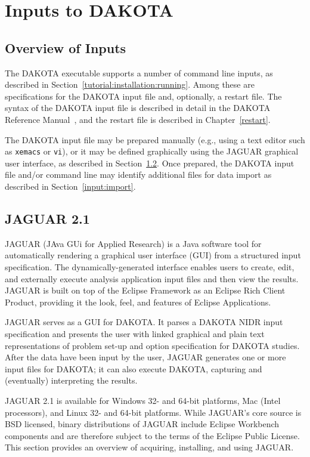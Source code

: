 \chapter{Inputs to DAKOTA}\label{input}

\section{Overview of Inputs}\label{input:overview}

The DAKOTA executable supports a number of command line inputs, as
described in Section~\ref{tutorial:installation:running}.  Among
these are specifications for the DAKOTA input file and, optionally, a
restart file.  The syntax of the DAKOTA input file is described in detail 
in the DAKOTA Reference Manual~\cite{RefMan}, and the restart file is
described in Chapter~\ref{restart}.

The DAKOTA input file may be prepared manually (e.g., using a text
editor such as \texttt{xemacs} or \texttt{vi}), or it may be defined
graphically using the JAGUAR graphical user interface, as described in
Section~\ref{input:gui}.  Once prepared, the DAKOTA input file and/or
command line may identify additional files for data import as
described in Section~\ref{input:import}.

\section{JAGUAR 2.1}\label{input:gui}

JAGUAR (JAva GUi for Applied Research) is a Java software tool for
automatically rendering a graphical user interface (GUI) from a
structured input specification.  The dynamically-generated interface
enables users to create, edit, and externally execute analysis
application input files and then view the results.  JAGUAR is built on
top of the Eclipse Framework \cite{Eclipse} as an Eclipse Rich
Client Product, providing it the look, feel, and features of Eclipse
Applications.

JAGUAR serves as a GUI for DAKOTA.  It parses a DAKOTA NIDR input
specification and presents the user with linked graphical and plain
text representations of problem set-up and option specification for
DAKOTA studies. After the data have been input by the user, JAGUAR
generates one or more input files for DAKOTA; it can also execute
DAKOTA, capturing and (eventually) interpreting the results.

JAGUAR 2.1 is available for Windows 32- and 64-bit platforms, Mac
(Intel processors), and Linux 32- and 64-bit platforms.  While
JAGUAR's core source is BSD licensed, binary distributions of JAGUAR
include Eclipse Workbench components and are therefore subject to the
terms of the Eclipse Public License.  This section provides an
overview of acquiring, installing, and using JAGUAR.


